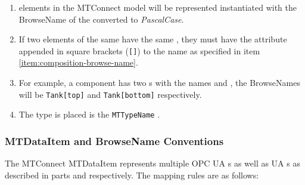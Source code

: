 \begin{enumerate}
  \item  {} elements in the MTConnect model will be represented instantiated with the \gls{BrowseName} of the   converted to \textit{PascalCase}. \label{item:composition-browse-name}
  \item If two  elements of the same  have the same , they must have the  attribute appended in square brackets (\texttt{[]}) to the name as specified in item \ref{item:composition-browse-name}.
  \item For example, a component has two s with the names  and , the \glspl{BrowseName} will be \texttt{Tank[top]} and \texttt{Tank[bottom]} respectively.
  \item The type is placed is the \texttt{MTTypeName} .
\end{enumerate}

\subsubsection{\gls{MTDataItem}  and \gls{BrowseName} Conventions}
\label{sec:data-item-conventions}

The MTConnect \gls{MTDataItem} represents multiple OPC UA s as well as UA s as described in parts \cite{UAPart8} and \cite{UAPart9} respectively. The mapping rules are as follows:

